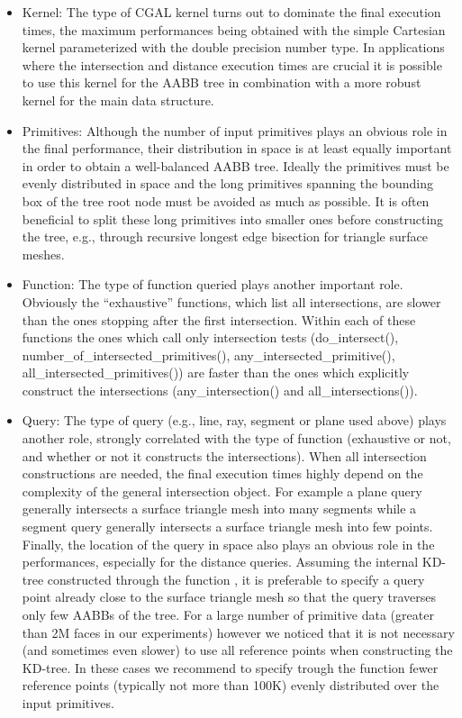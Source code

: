 \begin{itemize}

\item Kernel: The type of CGAL kernel turns out to dominate the final execution times, the maximum performances being obtained with the simple Cartesian kernel parameterized with the double precision number type. In applications where the intersection and distance execution times are crucial it is possible to use this kernel for the AABB tree in combination with a more robust kernel for the main data structure.

\item Primitives: Although the number of input primitives plays an obvious role in the final performance, their distribution in space is at least equally important in order to obtain a well-balanced AABB tree. Ideally the primitives must be evenly distributed in space and the long primitives spanning the bounding box of the tree root node must be avoided as much as possible. It is often beneficial to split these long primitives into smaller ones before constructing the tree, e.g., through recursive longest edge bisection for triangle surface meshes.

\item Function: The type of function queried plays another important role. Obviously the ``exhaustive'' functions, which list all intersections, are slower than the ones stopping after the first intersection. Within each of these functions the ones which call only intersection tests (do\_intersect(), number\_of\_intersected\_primitives(), any\_intersected\_primitive(), all\_intersected\_primitives()) are faster than the ones which explicitly construct the intersections (any\_intersection() and all\_intersections()).

\item Query: The type of query (e.g., line, ray, segment or plane used above) plays another role, strongly correlated with the type of function (exhaustive or not, and whether or not it constructs the intersections). When all intersection constructions are needed, the final execution times highly depend on the complexity of the general intersection object. For example a plane query generally intersects a surface triangle mesh into many segments while a segment query generally intersects a surface triangle mesh into few points. Finally, the location of the query in space also plays an obvious role in the performances, especially for the distance queries. Assuming the internal KD-tree constructed through the function , it is preferable to specify a query point already close to the surface triangle mesh so that the query traverses only few AABBs of the tree. For a large number of primitive data (greater than 2M faces in our experiments) however we noticed that it is not necessary (and sometimes even slower) to use all reference points when constructing the KD-tree. In these cases we recommend to specify trough the function  fewer reference points (typically not more than 100K) evenly distributed over the input primitives.

\end{itemize}

